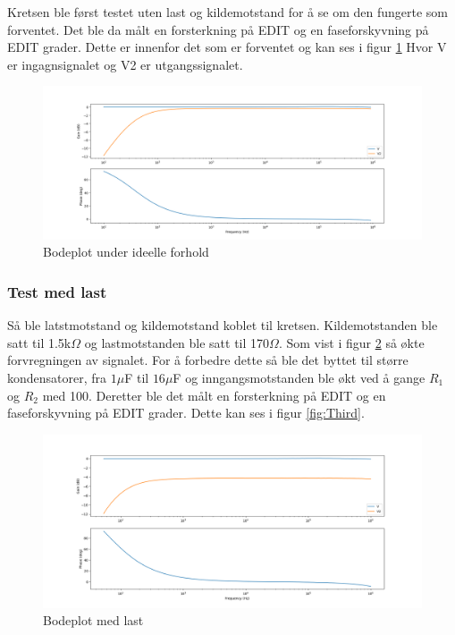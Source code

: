 Kretsen ble først testet uten last og kildemotstand for å se om den fungerte som forventet. Det ble da målt en forsterkning på EDIT og en faseforskyvning på EDIT grader. Dette er innenfor det som er forventet og kan ses i figur \ref{fig:Bodeplot+Pase_First} Hvor V er ingagnsignalet og V2 er utgangssignalet.

\begin{figure}[H]
\centering
\includegraphics[scale=0.4]{bilder/Bodeplot+Pase_First.png}
\caption{Bodeplot under ideelle forhold}
\label{fig:Bodeplot+Pase_First}
\end{figure}


\subsubsection{Test med last}

Så ble latstmotstand og kildemotstand koblet til kretsen. Kildemotstanden ble satt til 1.5k$\Omega$ og lastmotstanden ble satt til 170$\Omega$. Som vist i figur \ref{fig:Bodeplot+Pase_Second} så økte forvregningen av signalet. For å forbedre dette så ble det byttet til større kondensatorer, fra $1\mu$F til $16\mu$F og inngangsmotstanden ble økt ved å gange $R_1$ og $R_2$ med 100. Deretter ble det målt en forsterkning på EDIT og en faseforskyvning på EDIT grader. Dette kan ses i figur \ref{fig:Third}.

\begin{figure}[H]
\centering
\includegraphics[scale=0.4]{bilder/Bodeplot+Pase_Second.png}
\caption{Bodeplot med last}
\label{fig:Bodeplot+Pase_Second}
\end{figure}

